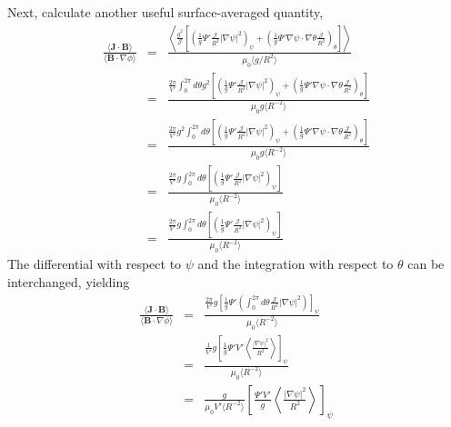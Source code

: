 \documentclass{article}
\begin{document}
Next, calculate another useful surface-averaged quantity,
\begin{eqnarray}
  \frac{\langle \mathbf{J} \cdot \mathbf{B} \rangle}{\langle \mathbf{B} \cdot
  \nabla \phi \rangle} & = & \frac{\left\langle \frac{g^2}{\mathcal{J}} \left[
  \left( \frac{1}{g} \Psi' \frac{\mathcal{J}}{R^2} | \nabla \psi |^2
  \right)_{\psi} + \left( \frac{1}{g} \Psi' \nabla \psi \cdot \nabla \theta
  \frac{\mathcal{J}}{R^2} \right)_{\theta} \right] \right\rangle}{\mu_0
  \langle g / R^2 \rangle} \nonumber\\
  & = & \frac{\frac{2 \pi}{V'} \int_0^{2 \pi} d \theta g^2 \left[ \left(
  \frac{1}{g} \Psi' \frac{\mathcal{J}}{R^2} | \nabla \psi |^2 \right)_{\psi} +
  \left( \frac{1}{g} \Psi' \nabla \psi \cdot \nabla \theta
  \frac{\mathcal{J}}{R^2} \right)_{\theta} \right]}{\mu_0 g \langle R^{- 2}
  \rangle} \nonumber\\
  & = & \frac{\frac{2 \pi}{V'} g^2 \int_0^{2 \pi} d \theta \left[ \left(
  \frac{1}{g} \Psi' \frac{\mathcal{J}}{R^2} | \nabla \psi |^2 \right)_{\psi} +
  \left( \frac{1}{g} \Psi' \nabla \psi \cdot \nabla \theta
  \frac{\mathcal{J}}{R^2} \right)_{\theta} \right]}{\mu_0 g \langle R^{- 2}
  \rangle} \nonumber\\
  & = & \frac{\frac{2 \pi}{V'} g \int_0^{2 \pi} d \theta \left[ \left(
  \frac{1}{g} \Psi' \frac{\mathcal{J}}{R^2} | \nabla \psi |^2 \right)_{\psi}
  \right]}{\mu_0 \langle R^{- 2} \rangle} \nonumber\\
  & = & \frac{\frac{2 \pi}{V'} g \int_0^{2 \pi} d \theta \left[ \left(
  \frac{1}{g} \Psi' \frac{\mathcal{J}}{R^2} | \nabla \psi |^2 \right)_{\psi}
  \right]}{\mu_0 \langle R^{- 2} \rangle} 
\end{eqnarray}
The differential with respect to $\psi$ and the integration with respect to
$\theta$ can be interchanged, yielding
\begin{eqnarray}
  \frac{\langle \mathbf{J} \cdot \mathbf{B} \rangle}{\langle \mathbf{B} \cdot
  \nabla \phi \rangle} & = & \frac{\frac{2 \pi}{V'} g \left[ \frac{1}{g} \Psi'
  \left( \int_0^{2 \pi} d \theta \frac{\mathcal{J}}{R^2} | \nabla \psi |^2
  \right) \right]_{\psi}}{\mu_0 \langle R^{- 2} \rangle} \nonumber\\
  & = & \frac{\frac{1}{V'} g \left[ \frac{1}{g} \Psi' V' \left\langle \frac{|
  \nabla \psi |^2}{R^2} \right\rangle \right]_{\psi}}{\mu_0 \langle R^{- 2}
  \rangle} \nonumber\\
  & = & \frac{g}{\mu_0 V' \langle R^{- 2} \rangle} \left[ \frac{\Psi' V'}{g}
  \left\langle \frac{| \nabla \psi |^2}{R^2} \right\rangle \right]_{\psi} 
\end{eqnarray}
\end{document}
